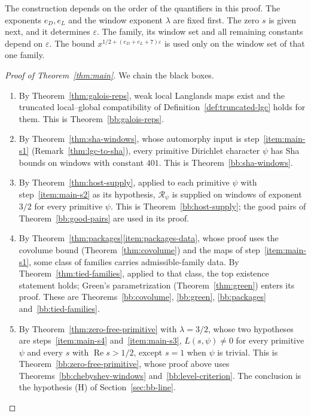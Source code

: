 \documentclass[11pt]{amsbook}
\theoremstyle{plain}
\theoremstyle{definition}
\theoremstyle{remark}
\numberwithin{equation}{section}
\numberwithin{figure}{chapter}
\numberwithin{table}{chapter}
\newcommand{\eps}{\varepsilon}
\begin{document}
\noindent The construction depends on the order of the quantifiers
in this proof. The exponents $e_D,e_L$ and the window exponent
$\lambda$ are fixed first. The zero $s$ is given next, and it
determines $\eps$. The family, its window set and all remaining
constants depend on $\eps$. The bound $x^{1/2+(e_D+e_L+7)\eps}$ is used only
on the window set of that one family.

\begin{proof}[Proof of Theorem~\ref{thm:main}]
We chain the black boxes.
\begin{enumerate}[label=(\arabic*)]
\item\label{item:main-s1}
By Theorem~\ref{thm:galois-reps}, weak local Langlands maps exist
and the truncated local--global compatibility of
Definition~\ref{def:truncated-lgc} holds for them. This is
Theorem~\ref{bb:galois-reps}.
\item\label{item:main-s2}
By Theorem~\ref{thm:sha-windows}, whose automorphy input is
step~\ref{item:main-s1} (Remark~\ref{thm:lgc-to-sha}), every
primitive Dirichlet character $\psi$ has Sha bounds on windows with
constant $401$. This is Theorem~\ref{bb:sha-windows}.
\item\label{item:main-s3}
By Theorem~\ref{thm:host-supply}, applied to each primitive $\psi$
with step~\ref{item:main-s2} as its hypothesis, $\mathscr R_\psi$ is
supplied on windows of exponent $3/2$ for every primitive $\psi$.
This is Theorem~\ref{bb:host-supply}; the good pairs of
Theorem~\ref{bb:good-pairs} are used in its proof.
\item\label{item:main-s4}
By Theorem~\ref{thm:packages}\ref{item:packages-data}, whose proof
uses the covolume bound (Theorem~\ref{thm:covolume}) and the maps of
step~\ref{item:main-s1}, some class of families carries
admissible-family data. By Theorem~\ref{thm:tied-families}, applied
to that class, the top existence statement holds; Green's
parametrization (Theorem~\ref{thm:green}) enters its proof. These
are Theorems~\ref{bb:covolume},
\ref{bb:green}, \ref{bb:packages} and~\ref{bb:tied-families}.
\item\label{item:main-s5}
By Theorem~\ref{thm:zero-free-primitive} with $\lambda=3/2$, whose
two hypotheses are steps~\ref{item:main-s4}
and~\ref{item:main-s3}, $L(s,\psi)\ne0$ for every primitive $\psi$
and every $s$ with $\operatorname{Re}s>1/2$, except $s=1$ when
$\psi$ is trivial. This is Theorem~\ref{bb:zero-free-primitive},
whose proof above uses Theorems~\ref{bb:chebyshev-windows}
and~\ref{bb:level-criterion}. The conclusion is the hypothesis (H)
of Section~\ref{sec:bb-line}.

\end{enumerate}
\end{proof}
\end{document}
